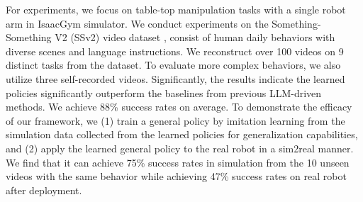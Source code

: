 For experiments, we focus on table-top manipulation tasks with a single robot arm in IsaacGym simulator\citep{makoviychuk2021isaac}. We conduct experiments on the Something-Something V2 (SSv2) video dataset \citep{goyal2017something}, consist of human daily behaviors with diverse scenes and language instructions. We reconstruct over 100 videos on 9 distinct tasks from the dataset. To evaluate more complex behaviors, we also utilize three self-recorded videos. Significantly, the results indicate the learned policies significantly outperform the baselines from previous LLM-driven methods. We achieve 88\% success rates on average. To demonstrate the efficacy of our framework, we (1) train a general policy by imitation learning from the simulation data collected from the learned policies for generalization capabilities, and (2) apply the learned general policy to the real robot in a sim2real manner.
We find that it can achieve 75\% success rates in simulation from the 10 unseen videos with the same behavior while achieving 47\% success rates on real robot after deployment.
